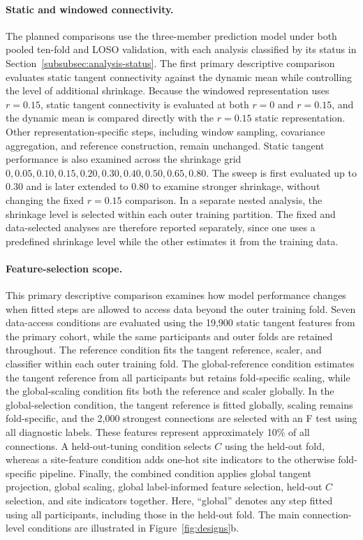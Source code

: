 \paragraph{\textbf{Static and windowed connectivity.}}
\label{par:static-windowed}
The planned comparisons use the three-member prediction model under both pooled ten-fold and LOSO validation, with each analysis classified by its status in Section~\ref{subsubsec:analysis-status}. The first primary descriptive comparison evaluates static tangent connectivity against the dynamic mean while controlling the level of additional shrinkage. Because the windowed representation uses $r=0.15$, static tangent connectivity is evaluated at both $r=0$ and $r=0.15$, and the dynamic mean is compared directly with the $r=0.15$ static representation. Other representation-specific steps, including window sampling, covariance aggregation, and reference construction, remain unchanged. Static tangent performance is also examined across the shrinkage grid ${0,0.05,0.10,0.15,0.20,0.30,0.40,0.50,0.65,0.80}$. The sweep is first evaluated up to 0.30 and is later extended to 0.80 to examine stronger shrinkage, without changing the fixed $r=0.15$ comparison. In a separate nested analysis, the shrinkage level is selected within each outer training partition. The fixed and data-selected analyses are therefore reported separately, since one uses a predefined shrinkage level while the other estimates it from the training data.

\paragraph{\textbf{Feature-selection scope.}}
\label{par:selection-scope}
This primary descriptive comparison examines how model performance changes when fitted steps are allowed to access data beyond the outer training fold. Seven data-access conditions are evaluated using the 19,900 static tangent features from the primary cohort, while the same participants and outer folds are retained throughout. The reference condition fits the tangent reference, scaler, and classifier within each outer training fold. The global-reference condition estimates the tangent reference from all participants but retains fold-specific scaling, while the global-scaling condition fits both the reference and scaler globally. In the global-selection condition, the tangent reference is fitted globally, scaling remains fold-specific, and the 2,000 strongest connections are selected with an F test using all diagnostic labels. These features represent approximately 10\% of all connections. A held-out-tuning condition selects $C$ using the held-out fold, whereas a site-feature condition adds one-hot site indicators to the otherwise fold-specific pipeline. Finally, the combined condition applies global tangent projection, global scaling, global label-informed feature selection, held-out $C$ selection, and site indicators together. Here, ``global'' denotes any step fitted using all participants, including those in the held-out fold. The main connection-level conditions are illustrated in Figure~\ref{fig:designs}b.

